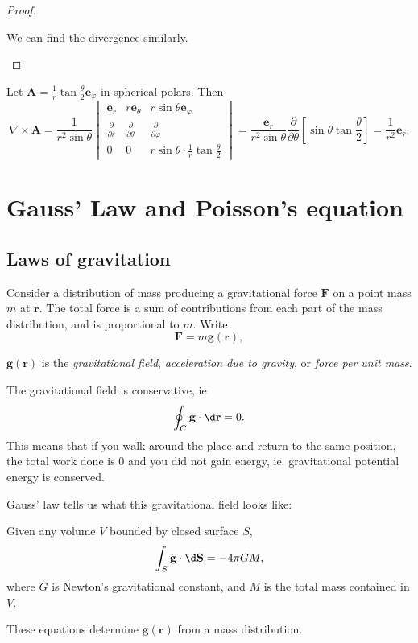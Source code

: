 \documentclass[a4paper]{article}
\begin{document}
\begin{proof}
\begin{enumerate}
      We can find the divergence similarly.
  \end{enumerate}
\end{proof}

\begin{eg}
  Let $\mathbf{A} = \frac{1}{r}\tan \frac{\theta}{2} \mathbf{e}_\varphi$ in spherical polars. Then
  \[
    \nabla\times \mathbf{A} = \frac{1}{r^2\sin \theta}
    \begin{vmatrix}
      \mathbf{e}_r & r\mathbf{e}_\theta & r\sin \theta \mathbf{e}_\varphi\\
      \frac{\partial}{\partial r} & \frac{\partial}{\partial \theta} & \frac{\partial}{\partial \varphi}\\
      0 & 0 & r\sin \theta \cdot \frac{1}{r}\tan \frac{\theta}{2}
    \end{vmatrix} = \frac{\mathbf{e}_r}{r^2\sin \theta}\frac{\partial}{\partial \theta}\left[\sin \theta\tan \frac{\theta}{2}\right] = \frac{1}{r^2}\mathbf{e}_r.
  \]
\end{eg}

\section{Gauss' Law and Poisson's equation}
\subsection{Laws of gravitation}
Consider a distribution of mass producing a gravitational force $\mathbf{F}$ on a point mass $m$ at $\mathbf{r}$. The total force is a sum of contributions from each part of the mass distribution, and is proportional to $m$. Write
\[
  \mathbf{F} = m\mathbf{g}(\mathbf{r}),
\]
\begin{defi}
  $\mathbf{g}(\mathbf{r})$ is the \emph{gravitational field}, \emph{acceleration due to gravity}, or \emph{force per unit mass}.
\end{defi}
The gravitational field is conservative, ie
\[
  \oint_C \mathbf{g}\cdot \d \mathbf{r} = 0.
\]
This means that if you walk around the place and return to the same position, the total work done is $0$ and you did not gain energy, ie. gravitational potential energy is conserved.

Gauss' law tells us what this gravitational field looks like:
\begin{law}
  Given any volume $V$ bounded by closed surface $S$,
  \[
    \int_S \mathbf{g}\cdot \d \mathbf{S} = -4\pi GM,
  \]
  where $G$ is Newton's gravitational constant, and $M$ is the total mass contained in $V$.
\end{law}
These equations determine $\mathbf{g}(\mathbf{r})$ from a mass distribution.
\end{document}

